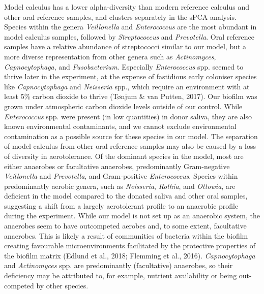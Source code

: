 \documentclass[
]{article}
\begin{document}
Model calculus has a lower alpha-diversity than modern reference
calculus and other oral reference samples, and clusters separately in
the sPCA analysis. Species within the genera \emph{Veillonella} and
\emph{Enterococcus} are the most abundant in model calculus samples,
followed by \emph{Streptococcus} and \emph{Prevotella}. Oral reference
samples have a relative abundance of streptococci similar to our model,
but a more diverse representation from other genera such as
\emph{Actinomyces}, \emph{Capnocytophaga}, and \emph{Fusobacterium}.
Especially \emph{Enterococcus} spp. seemed to thrive later in the
experiment, at the expense of fastidious early coloniser species like
\emph{Capnocytophaga} and \emph{Neisseria} spp., which require an
environment with at least 5\% carbon dioxide to thrive (Tønjum \& van
Putten, 2017). Our biofilm was grown under atmospheric carbon dioxide
levels outside of our control. While \emph{Enterococcus} spp. were
present (in low quantities) in donor saliva, they are also known
environmental contaminants, and we cannot exclude environmental
contamination as a possible source for these species in our model. The
separation of model calculus from other oral reference samples may also
be caused by a loss of diversity in aerotolerance. Of the dominant
species in the model, most are either anaerobes or facultative
anaerobes, predominantly Gram-negative \emph{Veillonella} and
\emph{Prevotella}, and Gram-positive \emph{Enterococcus}. Species within
predominantly aerobic genera, such as \emph{Neisseria}, \emph{Rothia},
and \emph{Ottowia}, are deficient in the model compared to the donated
saliva and other oral samples, suggesting a shift from a largely
aerotolerant profile to an anaerobic profile during the experiment.
While our model is not set up as an anaerobic system, the anaerobes seem
to have outcompeted aerobes and, to some extent, facultative anaerobes.
This is likely a result of communities of bacteria within the biofilm
creating favourable microenvironments facilitated by the protective
properties of the biofilm matrix (Edlund et al., 2018; Flemming et al.,
2016). \emph{Capnocytophaga} and \emph{Actinomyces} spp. are
predominantly (facultative) anaerobes, so their deficiency may be
attributed to, for example, nutrient availability or being out-competed
by other species.
\end{document}
